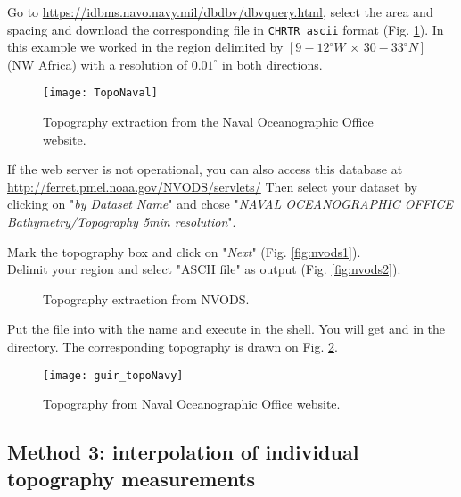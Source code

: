 Go to \url{https://idbms.navo.navy.mil/dbdbv/dbvquery.html}, select the area and spacing and download the corresponding file in \texttt{CHRTR ascii} format (Fig. \ref{fig:topoextract}). In this example we worked in the region delimited by $[9-12^{\circ}W\, \times\, 30-33^{\circ}N]$ (NW Africa) with a resolution of $0.01^{\circ}$ in both directions. 


\begin{figure}[htpb]
\centering
\texttt{[image: TopoNaval]}
\caption{Topography extraction from the Naval Oceanographic Office website.\label{fig:topoextract}}
\end{figure}

If the web server is not operational, you can also access this database at \url{http://ferret.pmel.noaa.gov/NVODS/servlets/}
Then select your dataset by clicking on "\textsl{by Dataset Name}" and chose 
"\textsl{NAVAL OCEANOGRAPHIC OFFICE Bathymetry/Topography 5min resolution}".

Mark the topography box and click on "\textsl{Next}" (Fig. \ref{fig:nvods1}).\\
Delimit your region and select "ASCII file" as output (Fig. \ref{fig:nvods2}). 


\begin{figure}[htpb]
\centering
{}

\caption{Topography extraction from NVODS.}
\end{figure}


Put the  file into  with the name  and execute  in the shell. You will get  and  in the  directory. The corresponding topography is drawn on Fig. \ref{fig:topoNaval}.


\begin{figure}[htpb]
\centering
\texttt{[image: guir\_topoNavy]}
\caption{Topography from Naval Oceanographic Office website.\label{fig:topoNaval}}
\end{figure}


\subsection{Method 3: interpolation of individual topography measurements\label{sec:topotopex}}

